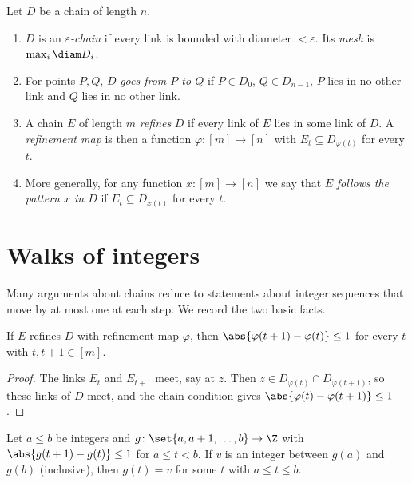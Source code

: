 \begin{definition}\label{def:chain-terms}
Let $D$ be a chain of length $n$.
\begin{enumerate}
\item $D$ is an \emph{$\varepsilon$-chain} if every link is bounded with diameter
$<\varepsilon$. Its \emph{mesh} is $\max_i\diam D_i$.
\item For points $P,Q$, $D$ \emph{goes from $P$ to $Q$} if $P\in D_0$, $Q\in D_{n-1}$, $P$ lies in
no other link and $Q$ lies in no other link.
\item A chain $E$ of length $m$ \emph{refines} $D$ if every link of $E$ lies in some link of
$D$. A \emph{refinement map} is then a function $\varphi\colon[m]\to[n]$ with
$E_t\subseteq D_{\varphi(t)}$ for every $t$.
\item More generally, for any function $x\colon[m]\to[n]$ we say that $E$ \emph{follows the
pattern $x$ in $D$} if $E_t\subseteq D_{x(t)}$ for every $t$.
\end{enumerate}
\end{definition}


\section{Walks of integers}

Many arguments about chains reduce to statements about integer sequences that move by at
most one at each step. We record the two basic facts.

\begin{lemma}\label{lem:refinement-lipschitz}
If $E$ refines $D$ with refinement map $\varphi$, then $\abs{\varphi(t+1)-\varphi(t)}\le1$ for
every $t$ with $t,t+1\in[m]$.
\end{lemma}

\begin{proof}
The links $E_t$ and $E_{t+1}$ meet, say at $z$. Then $z\in D_{\varphi(t)}\cap D_{\varphi(t+1)}$,
so these links of $D$ meet, and the chain condition gives
$\abs{\varphi(t)-\varphi(t+1)}\le1$.
\end{proof}


\begin{lemma}\label{lem:discrete-ivt}
Let $a\le b$ be integers and $g\colon\set{a,a+1,\dots,b}\to\Z$ with $\abs{g(t+1)-g(t)}\le1$ for
$a\le t<b$. If $v$ is an integer between $g(a)$ and $g(b)$ (inclusive), then $g(t)=v$ for
some $t$ with $a\le t\le b$.
\end{lemma}

